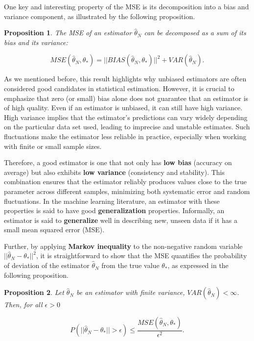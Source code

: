 \documentclass{report}
\newtheorem{proposition}{Proposition}[chapter]
\begin{document}
One key and interesting property of the MSE is its decomposition into a bias and variance component, as illustrated by the following proposition.

\begin{proposition}
The MSE of an estimator $\hat{\theta}_N$ can be decomposed as a sum of its bias and its variance:

\begin{equation}
MSE(\hat{\theta}_N,\theta_*) = ||BIAS(\hat{\theta}_N,\theta_*)||^2 + VAR(\hat{\theta}_N).
\end{equation}
\end{proposition}

As we mentioned before, this result highlights why unbiased estimators are often considered good candidates in statistical estimation. However, it is crucial to emphasize that zero (or small) bias alone does not guarantee that an estimator is of high quality. Even if an estimator is unbiased, it can still have high variance. High variance implies that the estimator’s predictions can vary widely depending on the particular data set used, leading to imprecise and unstable estimates. Such fluctuations make the estimator less reliable in practice, especially when working with finite or small sample sizes.

Therefore, a good estimator is one that not only has \textbf{low bias} (accuracy on average) but also exhibits \textbf{low variance} (consistency and stability). This combination ensures that the estimator reliably produces values close to the true parameter across different samples, minimizing both systematic error and random fluctuations. In the machine learning literature, an estimator with these properties is said to have good \textbf{generalization} properties. Informally, an estimator is said to \textbf{generalize} well in describing new, unseen data if it has a small mean squared error (MSE).

Further, by applying \textbf{Markov inequality} to the non-negative random variable $||\hat{\theta}_N- \theta_*||^2$, it is straightforward to show that the MSE quantifies the probability of deviation of the estimator $\hat{\theta}_N$ from the true value $\theta_*$, as expressed in the following proposition.

\begin{proposition}
Let $\hat{\theta}_N$ be an estimator with finite variance, $VAR(\hat{\theta}_N) < \infty$. Then, for all $\epsilon > 0$

\begin{equation}
P(||\hat{\theta}_N -\theta_*|| > \epsilon) \leq \frac{MSE(\hat{\theta}_N,\theta_*)}{\epsilon ^ 2}.
\end{equation}
\end{proposition}
\end{document}

